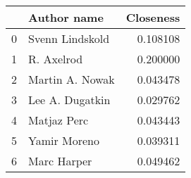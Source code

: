 \begin{tabular}{llr}
\toprule
{} &      Author name &  Closeness \\
\midrule
0 &  Svenn Lindskold &   0.108108 \\
1 &       R. Axelrod &   0.200000 \\
2 &  Martin A. Nowak &   0.043478 \\
3 &  Lee A. Dugatkin &   0.029762 \\
4 &      Matjaz Perc &   0.043443 \\
5 &     Yamir Moreno &   0.039311 \\
6 &      Marc Harper &   0.049462 \\
\bottomrule
\end{tabular}

